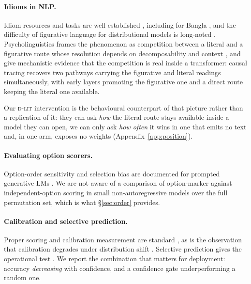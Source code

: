 \documentclass[11pt]{article}
\newcommand{\Dlit}{\textsc{d-lit}}
\begin{document}
\paragraph{Idioms in NLP.} Idiom resources and tasks are well established
\citep{haagsma2020magpie,tayyarmadabushi2022semeval,chakrabarty2022flute},
including for Bangla \citep{sakhawat-etal-2026-words}, and the difficulty of
figurative language for distributional models is long-noted
\citep{shwartz2019pain}. Psycholinguistics frames the phenomenon as competition
between a literal and a figurative route whose resolution depends on
decomposability and context
\citep{cacciari1988comprehension,gibbs1989kick,titone1999compositional}, and
\citet{oh2026tug} give mechanistic evidence that the competition is real inside
a transformer: causal tracing recovers two pathways carrying the figurative and
literal readings simultaneously, with early layers promoting the figurative one
and a direct route keeping the literal one available.

Our \Dlit{} intervention is the behavioural counterpart of that picture rather
than a replication of it: they can ask \emph{how} the literal route stays
available inside a model they can open, we can only ask \emph{how often} it
wins in one that emits no text and, in one arm, exposes no weights
(Appendix~\ref{app:position}).

\paragraph{Evaluating option scorers.} Option-order sensitivity and selection
bias are documented for prompted generative LMs
\citep{pezeshkpour2024order,wei2024selection,zheng2024robust,zhao2021calibrate}.
We are not aware of a comparison of option-marker against independent-option
scoring in small non-autoregressive models over the full permutation set, which
is what \S\ref{sec:order} provides.

\paragraph{Calibration and selective prediction.} Proper scoring and calibration
measurement are standard
\citep{brier1950verification,gneiting2007proper,guo2017calibration,nixon2019measuring,kumar2019verified},
as is the observation that calibration degrades under distribution shift
\citep{ovadia2019trust,jiang2021know}. Selective prediction gives the operational
test \citep{geifman2017selective,geifman2019selectivenet,traub2024selective}. We
report the combination that matters for deployment: accuracy \emph{decreasing}
with confidence, and a confidence gate underperforming a random one.
\end{document}
